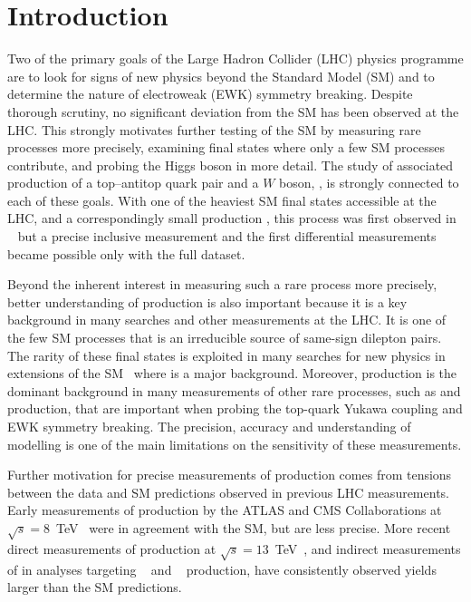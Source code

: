 \documentclass[cernpreprint, atlasdraft=false, texlive=2023, UKenglish, texmf, orcidlogo]{atlasdoc}
\author{The ATLAS Collaboration}
\begin{document}
 
\maketitle
 
 
 
\section{Introduction}
\label{sec:intro}

Two of the primary goals of the Large Hadron Collider (LHC) physics
programme are to look for signs of new physics beyond the Standard
Model (SM) and to determine the nature of electroweak (EWK) symmetry
breaking. Despite thorough scrutiny, no significant deviation from the
SM has been observed at the LHC. This strongly motivates
further testing of the SM by measuring rare processes more precisely,
examining final states where only a few SM processes contribute, and
probing the Higgs boson in more detail. The study of
associated production of a top--antitop quark pair and a
$W$ boson, \ttW, is strongly connected to each of these
goals. With one of the heaviest SM final states accessible at the LHC, and a
correspondingly small production \xs, this process was first observed
in \RunOne~\cite{TOPQ-2013-05,CMS-TOP-14-021} but a precise inclusive
measurement and the first differential measurements became possible
only with the full \RunTwo dataset.
 
Beyond the inherent interest in measuring such a rare process more
precisely, better understanding of \ttW production is also important
because it is a key background in many searches and other measurements at
the LHC. It is one of the few SM processes that is an irreducible source of
same-sign dilepton pairs.  The rarity of these final states is exploited in many
searches for new physics in extensions of the SM~\cite{EXOT-2016-16,SUSY-2018-09,CMS-SUS-19-008}
where \ttW is a major background.
Moreover, \ttW production is the dominant background in many
measurements of other rare processes, such as \ttH and \tttt production,
that are important when probing the top-quark Yukawa coupling and EWK symmetry breaking.
The precision, accuracy and understanding of \ttW modelling is one of the main limitations on
the sensitivity of these measurements.
 
Further motivation for precise measurements of \ttW production comes
from tensions between the data and SM predictions observed in previous LHC
measurements. Early measurements of \ttW production by the ATLAS and
CMS Collaborations at $\sqrt{s}=8$~TeV~\cite{TOPQ-2013-05,CMS-TOP-14-021} were in agreement with the SM,
but are less precise. More
recent direct measurements of \ttW production at
$\sqrt{s}=13$~TeV~\cite{TOPQ-2015-22,TOPQ-2016-11,CMS-TOP-17-005,CMS-TOP-21-011},
and indirect measurements of \ttW in analyses
targeting \ttH~\cite{CMS-HIG-19-008}
and \tttt~\cite{TOPQ-2021-08,CMS-TOP-22-013} production, have
consistently observed \ttW yields larger than the SM predictions.
 
\end{document}
